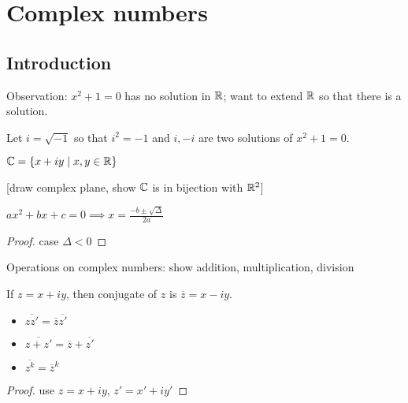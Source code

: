 \section{Complex numbers}

\subsection{Introduction}
Observation: $x^2+1=0$ has no solution in $\mathbb{R}$; want to extend $\mathbb{R}$ so that there is a solution.
\begin{definition}
    Let $i=\sqrt{-1}$ so that $i^2=-1$ and $i,-i$ are two solutions of $x^2+1=0$.
\end{definition}
\begin{definition}
    $\mathbb{C} = \{ x+iy \mid x,y \in \mathbb{R} \}$
\end{definition}
[draw complex plane, show $\mathbb{C}$ is in bijection with $\mathbb{R}^2$]

\begin{proposition}
    $ax^2+bx+c=0 \implies x=\frac{-b \pm \sqrt{\Delta}}{2a}$
\end{proposition}
\begin{proof}
    case $\Delta<0$
\end{proof}

Operations on complex numbers: show addition, multiplication, division

\begin{definition}[Conjugate]
    If $z=x+iy$, then conjugate of $z$ is $\overline{z}=x-iy$.
\end{definition}
\begin{property}
    \begin{itemize}
        \item $\overline{zz'}=\overline{z}\overline{z'}$
        \item $\overline{z+z'}=\overline{z}+\overline{z'}$
        \item $\overline{z^k}=\overline{z}^k$
    \end{itemize}
\end{property}
\begin{proof}
    use $z=x+iy$, $z'=x'+iy'$
\end{proof}

